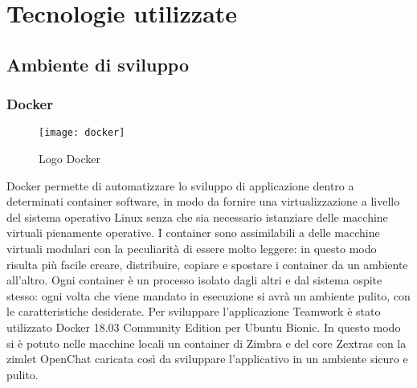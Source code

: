 
\chapter{Tecnologie utilizzate}\label{chap:tec}


\section{Ambiente di sviluppo}
\subsection{Docker}
	\begin{figure}[H] 
		\centering
		\texttt{[image: docker]}
		\caption{Logo Docker}
	\end{figure}
Docker permette di automatizzare lo sviluppo di applicazione dentro a 
determinati container software, 
in modo da fornire una virtualizzazione a livello del sistema operativo Linux
senza che sia necessario istanziare delle macchine virtuali pienamente 
operative.
I container sono assimilabili a delle macchine virtuali modulari con la
peculiarità di essere molto leggere: in questo modo risulta più facile creare,
distribuire, copiare e spostare i container da un ambiente all'altro.
Ogni container è un processo isolato dagli altri  e dal sistema ospite stesso: ogni
volta che viene mandato in esecuzione si avrà un ambiente pulito, con le
caratteristiche desiderate.  
Per sviluppare l'applicazione Teamwork è stato utilizzato Docker 18.03
Community Edition per Ubuntu Bionic. In questo modo si è potuto
 nelle macchine locali
un container di Zimbra e del core Zextras con la zimlet OpenChat caricata così
da sviluppare l'applicativo in un ambiente sicuro e pulito.

